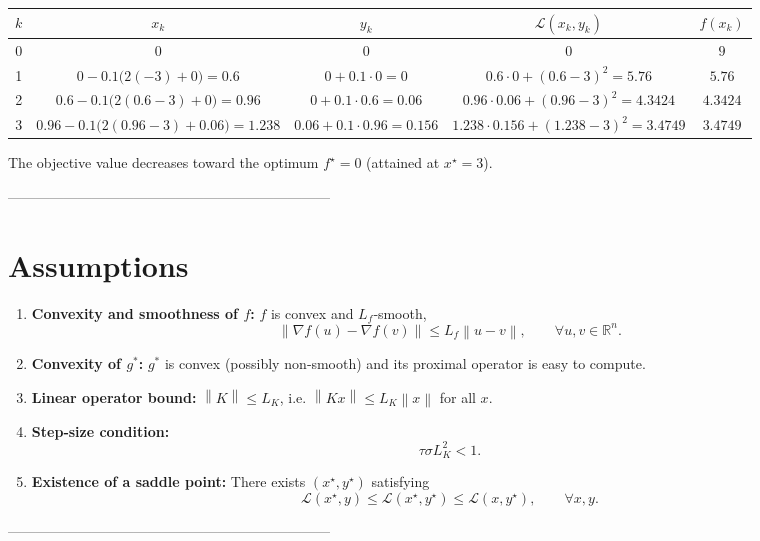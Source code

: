 \documentclass{article}
\newcommand{\norm}[1]{\left\lVert#1\right\rVert}
\begin{document}
\begin{center}
\begin{tabular}{c|c|c|c|c}
$k$ & $x_{k}$ & $y_{k}$ & $\mathcal L(x_{k},y_{k})$ & $f(x_{k})$\\ \hline
0 & $0$ & $0$ & $0$ & $9$\\
1 & $0-0.1\bigl(2(-3)+0\bigl)=0.6$ & $0+0.1\cdot0=0$ & $0.6\cdot0+(0.6-3)^{2}=5.76$ & $5.76$\\
2 & $0.6-0.1\bigl(2(0.6-3)+0\bigl)=0.96$ & $0+0.1\cdot0.6=0.06$ & $0.96\cdot0.06+(0.96-3)^{2}=4.3424$ & $4.3424$\\
3 & $0.96-0.1\bigl(2(0.96-3)+0.06\bigr)=1.238$ & $0.06+0.1\cdot0.96=0.156$ & $1.238\cdot0.156+(1.238-3)^{2}=3.4749$ & $3.4749$
\end{tabular}
\end{center}

The objective value decreases toward the optimum $f^{\star}=0$ (attained at $x^{\star}=3$).

---------------------------------------------------------------------

\section*{Assumptions}
\begin{enumerate}[label=(A\arabic*)]
\item \textbf{Convexity and smoothness of $f$:} $f$ is convex and $L_{f}$‑smooth,
\[
\norm{\nabla f(u)-\nabla f(v)}\le L_{f}\norm{u-v},\qquad\forall u,v\in\mathbb R^{n}.
\tag{A1}
\]
\item \textbf{Convexity of $g^{*}$:} $g^{*}$ is convex (possibly non‑smooth) and its proximal operator is easy to compute.
\item \textbf{Linear operator bound:} $\norm{K}\le L_{K}$, i.e. $\norm{Kx}\le L_{K}\norm{x}$ for all $x$.
\item \textbf{Step‑size condition:}
\[
\tau\sigma L_{K}^{2}<1.
\tag{A4}
\]
\item \textbf{Existence of a saddle point:} There exists $(x^{\star},y^{\star})$ satisfying
\[
\mathcal L(x^{\star},y)\le\mathcal L(x^{\star},y^{\star})\le\mathcal L(x,y^{\star}),\qquad\forall x,y.
\tag{A5}
\]
\end{enumerate}

---------------------------------------------------------------------
\end{document}
